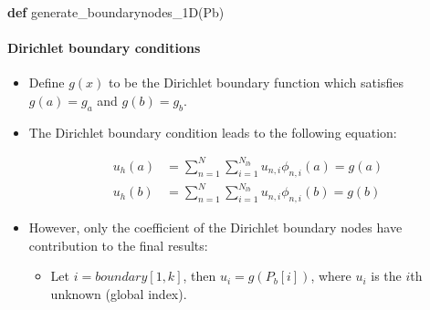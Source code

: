\documentclass[11pt]{article}
\providecommand{\tightlist}{%
      \setlength{\itemsep}{0pt}\setlength{\parskip}{0pt}}
\newenvironment{Shaded}{}{}
\newcommand{\KeywordTok}[1]{\textcolor[rgb]{0.00,0.44,0.13}{\textbf{{#1}}}}
\newcommand{\NormalTok}[1]{{#1}}
\begin{document}
\begin{Shaded}
\begin{Highlighting}[]
    \KeywordTok{def}\NormalTok{ generate_boundarynodes_1D(Pb)}
\end{Highlighting}
\end{Shaded}

    \paragraph{Dirichlet boundary
conditions}\label{dirichlet-boundary-conditions}

\begin{itemize}
\tightlist
\item
  Define \(g(x)\) to be the Dirichlet boundary function which satisfies
  \(g(a)=g_a\) and \(g(b)=g_b\).
\item
  The Dirichlet boundary condition leads to the following equation:

  \begin{align}
  u_h(a) & = \sum\limits_{n = 1}^N\sum\limits_{i=1}^{N_{lb}}u_{n,i}\phi_{n,i}(a) = g(a)\\
  u_h(b) & = \sum\limits_{n = 1}^N\sum\limits_{i=1}^{N_{lb}}u_{n,i}\phi_{n,i}(b) = g(b)
  \end{align}
\item
  However, only the coefficient of the Dirichlet boundary nodes have
  contribution to the final results:

  \begin{itemize}
  \tightlist
  \item
    Let \(i = boundary[1,k]\), then \(u_i = g(P_b[i])\), where \(u_i\)
    is the \(i\)th unknown (global index).
  \end{itemize}
\end{itemize}
\end{document}
